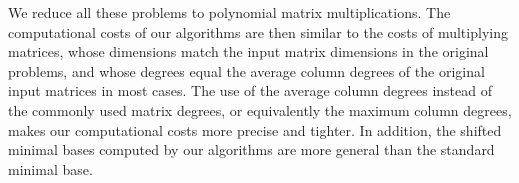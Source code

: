 We reduce all these problems to polynomial matrix multiplications.
The computational costs of our algorithms are then similar to the
costs of multiplying matrices, whose dimensions match the input matrix
dimensions in the original problems, and whose degrees equal the average
column degrees of the original input matrices in most cases. The use
of the average column degrees instead of the commonly used matrix
degrees, or equivalently the maximum column degrees, makes our computational
costs more precise and tighter. In addition, the shifted minimal bases
computed by our algorithms are more general than the standard minimal
base.
